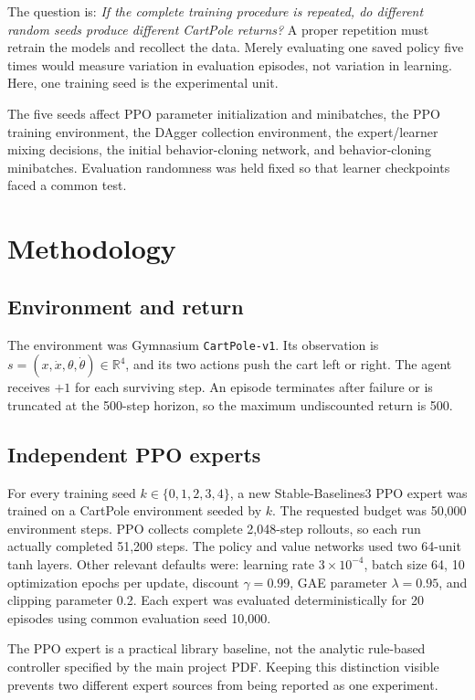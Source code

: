 \documentclass[11pt]{article}
\begin{document}
The question is: \emph{If the complete training procedure is repeated, do different random seeds produce different CartPole returns?} A proper repetition must retrain the models and recollect the data. Merely evaluating one saved policy five times would measure variation in evaluation episodes, not variation in learning. Here, one training seed is the experimental unit.

The five seeds affect PPO parameter initialization and minibatches, the PPO training environment, the DAgger collection environment, the expert/learner mixing decisions, the initial behavior-cloning network, and behavior-cloning minibatches. Evaluation randomness was held fixed so that learner checkpoints faced a common test.

\section{Methodology}

\subsection{Environment and return}

The environment was Gymnasium \texttt{CartPole-v1}. Its observation is $s=(x,\dot{x},\theta,\dot{\theta})\in\mathbb{R}^4$, and its two actions push the cart left or right. The agent receives $+1$ for each surviving step. An episode terminates after failure or is truncated at the 500-step horizon, so the maximum undiscounted return is 500.

\subsection{Independent PPO experts}

For every training seed $k\in\{0,1,2,3,4\}$, a new Stable-Baselines3 PPO expert was trained on a CartPole environment seeded by $k$. The requested budget was 50,000 environment steps. PPO collects complete 2,048-step rollouts, so each run actually completed 51,200 steps. The policy and value networks used two 64-unit tanh layers. Other relevant defaults were: learning rate $3\times10^{-4}$, batch size 64, 10 optimization epochs per update, discount $\gamma=0.99$, GAE parameter $\lambda=0.95$, and clipping parameter 0.2. Each expert was evaluated deterministically for 20 episodes using common evaluation seed 10,000.

The PPO expert is a practical library baseline, not the analytic rule-based controller specified by the main project PDF. Keeping this distinction visible prevents two different expert sources from being reported as one experiment.
\end{document}
